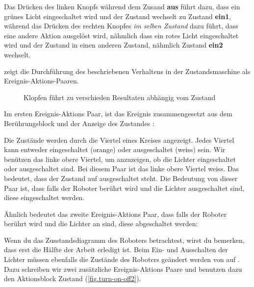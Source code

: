 Das Drücken des linken Knopfs während dem Zusand \textbf{aus} führt dazu, dass ein grünes Licht eingeschaltet wird und der Zustand wechselt zu Zustand \textbf{ein1}, während das Drücken des rechten Knopfes  \emph{im selben Zustand} dazu führt, dass eine andere Aktion ausgelöst wird, nähmlich dass ein rotes Licht eingeschaltet wird und der Zustand in einen anderen Zustand, nähmlich Zustand \textbf{ein2} wechselt.


 zeigt die Durchführung des beschriebenen Verhaltens in der Zustandsmaschine als Ereignis-Aktions-Paaren.

\begin{figure}
	\hfill
	\caption{Klopfen führt zu verschieden Resultaten abhängig vom Zustand}
	\label{fig.turn-on-off}
\end{figure}


Im ersten Ereignis-Aktions Paar, ist das Ereignis zusammengesetzt aus dem Berührungsblock und der Anzeige des Zustandes : 

Die Zustände werden durch die Viertel eines Kreises angezeigt. Jedes Viertel kann entweder eingeschaltet (orange) oder ausgeschaltet (weiss) sein. Wir benützen das linke obere Viertel, um anzuzeigen, ob die Lichter eingeschaltet oder ausgeschaltet sind. Bei diesem Paar ist das linke obere Viertel weiss. Das bedeutet, dass der Zustand auf ausgeschaltet steht. Die Bedeutung von dieser Paar ist, dass falls der Roboter berührt wird und die Lichter ausgeschaltet sind, diese eingeschaltet werden.

Ähnlich bedeutet das zweite Ereignis-Aktions Paar, dass falls der Roboter berührt wird und die Lichter an sind, diese abgeschaltet werden:

Wenn du das Zusstandsdiagramm des Roboters betrachtest, wirst du bemerken, dass erst die Hälfte der Arbeit erledigt ist. Beim Ein- und Ausschalten der Lichter müssen ebenfalls die Zustände des Roboters geändert werden von  auf  . Dazu schreiben wir zwei zusätzliche Ereignis-Aktions Paare und benutzen dazu den Aktionsblock Zustand  (\cref{fig.turn-on-off2}).

